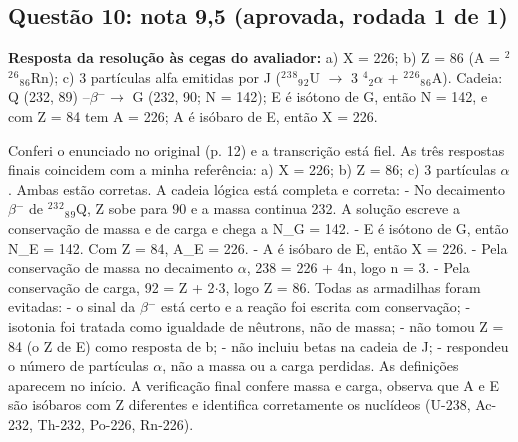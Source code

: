 \documentclass{article}%
\begin{document}
\subsection*{Questão 10: nota 9,5 (aprovada, rodada 1 de 1)}%
\textbf{Resposta da resolução às cegas do avaliador:} a) X = 226; b) Z = 86 (A = $^2$$^2$$^{6}$$_{8}$$_{6}$Rn); c) 3 partículas alfa emitidas por J ($^2$$^3$$^{8}$$_{9}$$_{2}$U $\to$ 3 $^{4}$$_{2}$$\alpha$ + $^2$$^2$$^{6}$$_{8}$$_{6}$A). Cadeia: Q (232, 89) --$\beta$$^{-}$$\to$ G (232, 90; N = 142); E é isótono de G, então N = 142, e com Z = 84 tem A = 226; A é isóbaro de E, então X = 226.\par %
Conferi o enunciado no original (p. 12) e a transcrição está fiel. As três respostas finais coincidem com a minha referência: a) X = 226; b) Z = 86; c) 3 partículas $\alpha$. Ambas estão corretas.\newline%
\newline%
A cadeia lógica está completa e correta:\newline%
{-} No decaimento $\beta$$^{-}$ de $^2$$^3$$^2$$_{8}$$_{9}$Q, Z sobe para 90 e a massa continua 232. A solução escreve a conservação de massa e de carga e chega a N\_G = 142.\newline%
{-} E é isótono de G, então N\_E = 142. Com Z = 84, A\_E = 226.\newline%
{-} A é isóbaro de E, então X = 226.\newline%
{-} Pela conservação de massa no decaimento $\alpha$, 238 = 226 + 4n, logo n = 3.\newline%
{-} Pela conservação de carga, 92 = Z + 2$\cdot$3, logo Z = 86.\newline%
\newline%
Todas as armadilhas foram evitadas:\newline%
{-} o sinal da $\beta$$^{-}$ está certo e a reação foi escrita com conservação;\newline%
{-} isotonia foi tratada como igualdade de nêutrons, não de massa;\newline%
{-} não tomou Z = 84 (o Z de E) como resposta de b;\newline%
{-} não incluiu betas na cadeia de J;\newline%
{-} respondeu o número de partículas $\alpha$, não a massa ou a carga perdidas.\newline%
\newline%
As definições aparecem no início. A verificação final confere massa e carga, observa que A e E são isóbaros com Z diferentes e identifica corretamente os nuclídeos (U{-}238, Ac{-}232, Th{-}232, Po{-}226, Rn{-}226).\newline%
\end{document}
